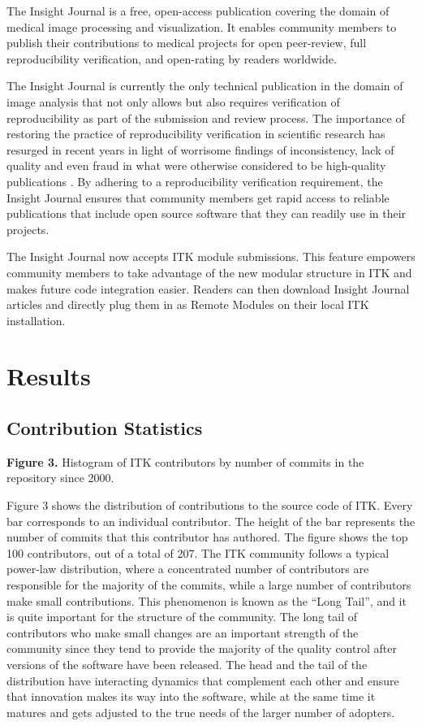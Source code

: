 \documentclass{frontiersENG} %
\begin{document}
The Insight Journal is a free, open-access publication covering the domain of
medical image processing and visualization. It enables community members to
publish their contributions to medical projects for open peer-review, full
reproducibility verification, and open-rating by readers worldwide.

The Insight Journal is currently the only technical publication in the domain
of image analysis that not only allows but also requires verification of
reproducibility as part of the submission and review process. The importance of
restoring the practice of reproducibility verification in scientific research
has resurged in recent years in light of worrisome findings of inconsistency,
lack of quality and even fraud in what were otherwise considered to be
high-quality publications \cite{Begley2012}. By adhering to a reproducibility
verification requirement, the Insight Journal ensures that community members
get rapid access to reliable publications that include open source software
that they can readily use in their projects.

The Insight Journal now accepts ITK module submissions. This feature empowers
community members to take advantage of the new modular structure in ITK and
makes future code integration easier. Readers can then download Insight Journal
articles and directly plug them in as Remote Modules on their local ITK
installation.




\section{Results}


\subsection{Contribution Statistics}

\textbf{Figure 3. }{Histogram of ITK contributors by number of commits in the repository since 2000.}\label{fig:03}

Figure 3 shows the distribution of contributions to the source code of ITK.
Every bar corresponds to an individual contributor. The height of the bar
represents the number of commits that this contributor has authored.  The
figure shows the top 100 contributors, out of a total of 207. The ITK community
follows a typical power-law distribution, where a concentrated number of
contributors are responsible for the majority of the commits, while a large
number of contributors make small contributions.  This phenomenon is known as
the ``Long Tail'', and it is quite important for the structure of the
community. The long tail of contributors who make small changes are an
important strength of the community since they tend to provide the majority of
the quality control after versions of the software have been released. The head
and the tail of the distribution have interacting dynamics that complement each
other and ensure that innovation makes its way into the software, while at the
same time it matures and gets adjusted to the true needs of the larger number
of adopters.
\end{document}
